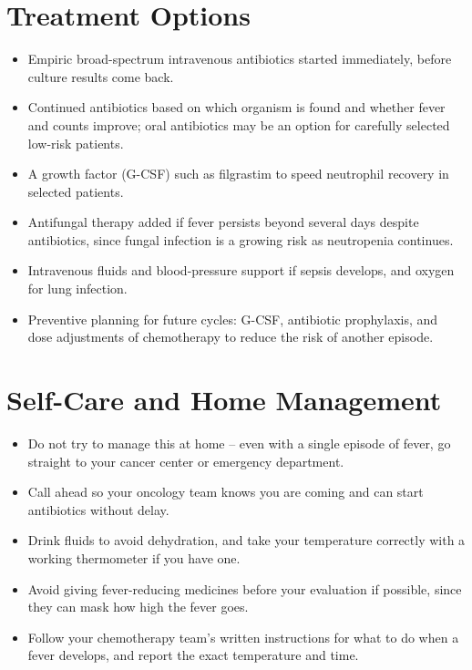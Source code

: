 \section*{Treatment Options}
\begin{itemize}
  \item Empiric broad-spectrum intravenous antibiotics started immediately, before culture results come back.
  \item Continued antibiotics based on which organism is found and whether fever and counts improve; oral antibiotics may be an option for carefully selected low-risk patients.
  \item A growth factor (G-CSF) such as filgrastim to speed neutrophil recovery in selected patients.
  \item Antifungal therapy added if fever persists beyond several days despite antibiotics, since fungal infection is a growing risk as neutropenia continues.
  \item Intravenous fluids and blood-pressure support if sepsis develops, and oxygen for lung infection.
  \item Preventive planning for future cycles: G-CSF, antibiotic prophylaxis, and dose adjustments of chemotherapy to reduce the risk of another episode.
\end{itemize}


\section*{Self-Care and Home Management}
\begin{itemize}
  \item Do not try to manage this at home -- even with a single episode of fever, go straight to your cancer center or emergency department.
  \item Call ahead so your oncology team knows you are coming and can start antibiotics without delay.
  \item Drink fluids to avoid dehydration, and take your temperature correctly with a working thermometer if you have one.
  \item Avoid giving fever-reducing medicines before your evaluation if possible, since they can mask how high the fever goes.
  \item Follow your chemotherapy team's written instructions for what to do when a fever develops, and report the exact temperature and time.
\end{itemize}

